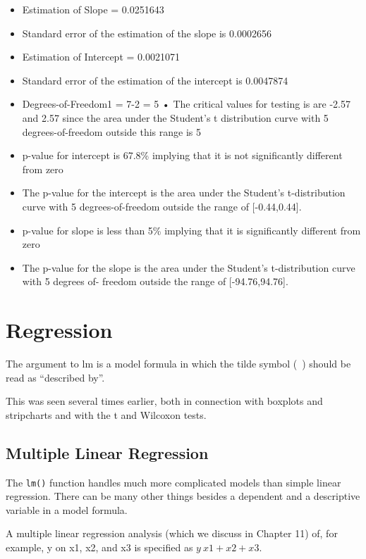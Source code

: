 \begin{itemize}
\item Estimation of Slope = 0.0251643 \item  Standard error of the
estimation of the slope is 0.0002656 \item Estimation of Intercept
= 0.0021071 \item Standard error of the estimation of the
intercept is 0.0047874 \item Degrees-of-Freedom1 = 7-2 = 5 • The
critical values for testing is are -2.57 and 2.57 since the area
under the Student’s t distribution
curve with 5 degrees-of-freedom outside this range is 5%
\item p-value for intercept is 67.8\% implying that it is not
significantly different from zero \item The p-value for the
intercept is the area under the Student’s t-distribution curve
with 5 degrees-of-freedom outside the range of [-0.44,0.44]. 

\item 
p-value for slope is less than 5\% implying that it is
significantly different from zero 
\item The p-value for the slope
is the area under the Student’s t-distribution curve with 5 
degrees of- freedom outside the range of [-94.76,94.76].
\end{itemize}

\section{Regression}

The argument to lm is a model formula in which the tilde symbol
(~) should be read as ``described by”.


This was seen several times earlier, both in connection with
boxplots and stripcharts and with the t and Wilcoxon tests.



\subsection{Multiple Linear Regression}
The \texttt{lm()} function handles much more
complicated models than simple linear regression. There can be many other things besides a dependent and a descriptive variable in a model formula.

A multiple linear regression analysis (which we discuss in Chapter
11) of, for example, y on x1, x2, and x3 is specified as $y ~ x1 +
x2 + x3$.



